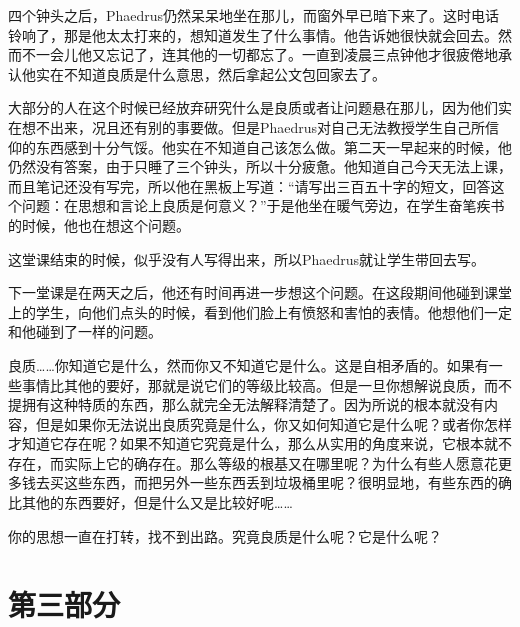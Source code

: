 \documentclass[UTF8]{article}
\begin{document}
\par 四个钟头之后，Phaedrus仍然呆呆地坐在那儿，而窗外早已暗下来了。这时电话铃响了，那是他太太打来的，想知道发生了什么事情。他告诉她很快就会回去。然而不一会儿他又忘记了，连其他的一切都忘了。一直到凌晨三点钟他才很疲倦地承认他实在不知道良质是什么意思，然后拿起公文包回家去了。
\par 大部分的人在这个时候已经放弃研究什么是良质或者让问题悬在那儿，因为他们实在想不出来，况且还有别的事要做。但是Phaedrus对自己无法教授学生自己所信仰的东西感到十分气馁。他实在不知道自己该怎么做。第二天一早起来的时候，他仍然没有答案，由于只睡了三个钟头，所以十分疲惫。他知道自己今天无法上课，而且笔记还没有写完，所以他在黑板上写道：“请写出三百五十字的短文，回答这个问题：在思想和言论上良质是何意义？”于是他坐在暖气旁边，在学生奋笔疾书的时候，他也在想这个问题。
\par 这堂课结束的时候，似乎没有人写得出来，所以Phaedrus就让学生带回去写。
\par 下一堂课是在两天之后，他还有时间再进一步想这个问题。在这段期间他碰到课堂上的学生，向他们点头的时候，看到他们脸上有愤怒和害怕的表情。他想他们一定和他碰到了一样的问题。
\par 良质……你知道它是什么，然而你又不知道它是什么。这是自相矛盾的。如果有一些事情比其他的要好，那就是说它们的等级比较高。但是一旦你想解说良质，而不提拥有这种特质的东西，那么就完全无法解释清楚了。因为所说的根本就没有内容，但是如果你无法说出良质究竟是什么，你又如何知道它是什么呢？或者你怎样才知道它存在呢？如果不知道它究竟是什么，那么从实用的角度来说，它根本就不存在，而实际上它的确存在。那么等级的根基又在哪里呢？为什么有些人愿意花更多钱去买这些东西，而把另外一些东西丢到垃圾桶里呢？很明显地，有些东西的确比其他的东西要好，但是什么又是比较好呢……
\par 你的思想一直在打转，找不到出路。究竟良质是什么呢？它是什么呢？
\section*{第三部分}
\end{document}
